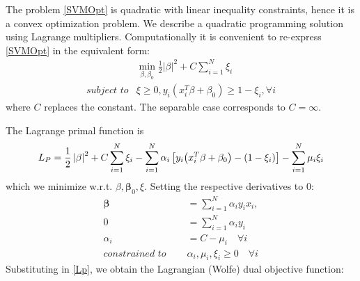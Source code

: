 \documentclass[12pt, letterpaper]{article}
\theoremstyle{definition}
\newcommand{\be}{\mathbf{\beta}}
\DeclarePairedDelimiter\autobracket{(}{)}
\newcommand{\br}[1]{\autobracket*{#1}}
\begin{document}
The problem \ref{SVMOpt} is quadratic with linear inequality constraints, hence it is a convex optimization problem. We describe a quadratic programming solution using Lagrange multipliers. Computationally it is convenient to re-express \ref{SVMOpt} in the equivalent form:
\begin{equation}
\begin{aligned}
&\min_{\beta, \beta_0} \frac{1}{2}\left|\beta\right|^2 + C\sum_{i=1}^N \xi_i\\
\textit{subject to} &\xi \ge 0, y_i(x_i^T\beta+\beta_0)\ge 1-\xi_i, \forall i
\end{aligned}
\end{equation}
where $C$ replaces the constant. The separable case corresponds to $C = \infty$.

The Lagrange primal function is 
\begin{equation}
L_P = \frac{1}{2}\left| \beta\right|^2 + C \sum_{i=1}^N \xi_i - \sum_{i=1}^N \alpha_i \left[y_i\br{x_i^T\beta+\beta_0}-\br{1-\xi_i}\right] - \sum_{i=1}^N \mu_i \xi_i 
\label{Lp}
\end{equation}
which we minimize w.r.t. $\beta, \be_0, \xi$. Setting the respective derivatives to $0$:
\begin{equation}
\begin{aligned}
\be &= \sum_{i=1}^N  \alpha_i y_i x_i,\\
0 &= \sum_{i=1}^N \alpha_i y_i\\
\alpha_i &= C - \mu_i \quad \forall i\\
\textit{constrained to } \quad  &\alpha_i,\mu_i, \xi_i \ge 0 \quad \forall i
\end{aligned}
\end{equation}
Substituting in \ref{Lp}, we obtain the Lagrangian (Wolfe) dual objective function:
\end{document}

